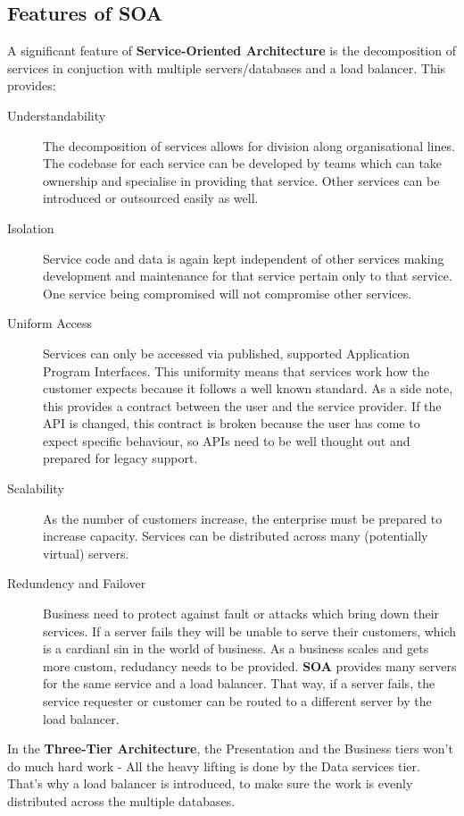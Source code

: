 \documentclass[11pt]{article}
\begin{document}
\subsection{Features of SOA}

A significant feature of \textbf{Service-Oriented Architecture} is the decomposition of services in conjuction with multiple servers/databases and a load balancer. This provides:
\begin{description}
  \item[Understandability]
  The decomposition of services allows for division along organisational lines. The codebase for each service can be developed by teams which can take ownership and specialise in providing that service. Other services can be introduced or outsourced easily as well.
  \item[Isolation]
  Service code and data is again kept independent of other services making development and maintenance for that service pertain only to that service. One service being compromised will not compromise other services.
  \item[Uniform Access]
  Services can only be accessed via published, supported Application Program Interfaces. This uniformity means that services work how the customer expects because it follows a well known standard. As a side note, this provides a contract between the user and the service provider. If the API is changed, this contract is broken because the user has come to expect specific behaviour, so APIs need to be well thought out and prepared for legacy support.
  \item[Scalability]
  As the number of customers increase, the enterprise must be prepared to increase capacity. Services can be distributed across many (potentially virtual) servers.
  \item[Redundency and Failover]
  Business need to protect against fault or attacks which bring down their services. If a server fails they will be unable to serve their customers, which is a cardianl sin in the world of business. As a business scales and gets more custom, redudancy needs to be provided. \textbf{SOA} provides many servers for the same service and a load balancer. That way, if a server fails, the service requester or customer can be routed to a different server by the load balancer.
\end{description}

In the \textbf{Three-Tier Architecture}, the Presentation and the Business tiers won’t do much hard work - All the heavy lifting is done by the Data services tier. That’s why a load balancer is introduced, to make sure the work is evenly distributed across the multiple databases.
\end{document}
